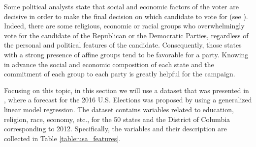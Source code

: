 Some political analysts state that social and economic factors of the voter are decisive in order to make the final decision on which candidate to vote for (see \cite{economist}). Indeed, there are some religious, economic or racial groups who overwhelmingly vote for the candidate of the Republican or the Democratic Parties, regardless of the personal and political features of the candidate. Consequently, those states with a strong presence of affine groups tend to be favorable for a party. Knowing in advance the social and economic composition of each state and the commitment of each group to each party is greatly helpful for the campaign. 

Focusing on this topic, in this section we will use a dataset that was presented in \cite{Rotger2016}, where a forecast for the 2016 U.S. Elections was proposed by using a generalized linear model regression. The dataset contains variables related to education, religion, race, economy, etc., for the 50 states and the District of Columbia corresponding to 2012. Specifically, the variables and their description are collected in Table \ref{table:usa_features}.

